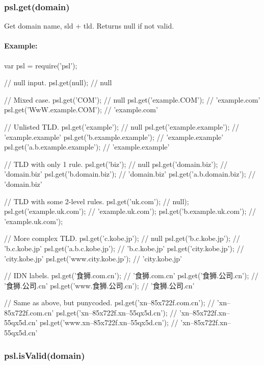 \subsubsection*{{\ttfamily psl.\+get(domain)}}

Get domain name, {\ttfamily sld} + {\ttfamily tld}. Returns {\ttfamily null} if not valid.

\paragraph*{Example\+:}


\begin{DoxyCode}
var psl = require('psl');

// null input.
psl.get(null); // null

// Mixed case.
psl.get('COM'); // null
psl.get('example.COM'); // 'example.com'
psl.get('WwW.example.COM'); // 'example.com'

// Unlisted TLD.
psl.get('example'); // null
psl.get('example.example'); // 'example.example'
psl.get('b.example.example'); // 'example.example'
psl.get('a.b.example.example'); // 'example.example'

// TLD with only 1 rule.
psl.get('biz'); // null
psl.get('domain.biz'); // 'domain.biz'
psl.get('b.domain.biz'); // 'domain.biz'
psl.get('a.b.domain.biz'); // 'domain.biz'

// TLD with some 2-level rules.
psl.get('uk.com'); // null);
psl.get('example.uk.com'); // 'example.uk.com');
psl.get('b.example.uk.com'); // 'example.uk.com');

// More complex TLD.
psl.get('c.kobe.jp'); // null
psl.get('b.c.kobe.jp'); // 'b.c.kobe.jp'
psl.get('a.b.c.kobe.jp'); // 'b.c.kobe.jp'
psl.get('city.kobe.jp'); // 'city.kobe.jp'
psl.get('www.city.kobe.jp'); // 'city.kobe.jp'

// IDN labels.
psl.get('食狮.com.cn'); // '食狮.com.cn'
psl.get('食狮.公司.cn'); // '食狮.公司.cn'
psl.get('www.食狮.公司.cn'); // '食狮.公司.cn'

// Same as above, but punycoded.
psl.get('xn--85x722f.com.cn'); // 'xn--85x722f.com.cn'
psl.get('xn--85x722f.xn--55qx5d.cn'); // 'xn--85x722f.xn--55qx5d.cn'
psl.get('www.xn--85x722f.xn--55qx5d.cn'); // 'xn--85x722f.xn--55qx5d.cn'
\end{DoxyCode}


\subsubsection*{{\ttfamily psl.\+is\+Valid(domain)}}


